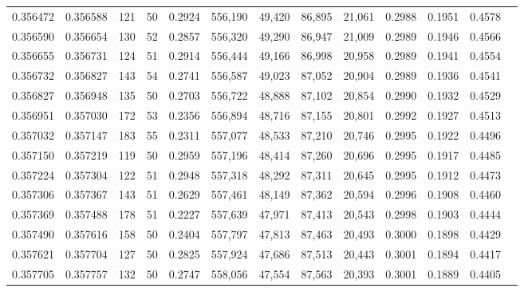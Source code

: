 \begin{tabular}{rrrrrrrrrrrrr}
0.356472 & 0.356588 &   121 &  50 &                                     0.2924 & 556,190 &  49,420 &  86,895 &  21,061 & 0.2988 & 0.1951 & 0.4578 \\
0.356590 & 0.356654 &   130 &  52 &                                     0.2857 & 556,320 &  49,290 &  86,947 &  21,009 & 0.2989 & 0.1946 & 0.4566 \\
0.356655 & 0.356731 &   124 &  51 &                                     0.2914 & 556,444 &  49,166 &  86,998 &  20,958 & 0.2989 & 0.1941 & 0.4554 \\
0.356732 & 0.356827 &   143 &  54 &                                     0.2741 & 556,587 &  49,023 &  87,052 &  20,904 & 0.2989 & 0.1936 & 0.4541 \\
0.356827 & 0.356948 &   135 &  50 &                                     0.2703 & 556,722 &  48,888 &  87,102 &  20,854 & 0.2990 & 0.1932 & 0.4529 \\
0.356951 & 0.357030 &   172 &  53 &                                     0.2356 & 556,894 &  48,716 &  87,155 &  20,801 & 0.2992 & 0.1927 & 0.4513 \\
0.357032 & 0.357147 &   183 &  55 &                                     0.2311 & 557,077 &  48,533 &  87,210 &  20,746 & 0.2995 & 0.1922 & 0.4496 \\
0.357150 & 0.357219 &   119 &  50 &                                     0.2959 & 557,196 &  48,414 &  87,260 &  20,696 & 0.2995 & 0.1917 & 0.4485 \\
0.357224 & 0.357304 &   122 &  51 &                                     0.2948 & 557,318 &  48,292 &  87,311 &  20,645 & 0.2995 & 0.1912 & 0.4473 \\
0.357306 & 0.357367 &   143 &  51 &                                     0.2629 & 557,461 &  48,149 &  87,362 &  20,594 & 0.2996 & 0.1908 & 0.4460 \\
0.357369 & 0.357488 &   178 &  51 &                                     0.2227 & 557,639 &  47,971 &  87,413 &  20,543 & 0.2998 & 0.1903 & 0.4444 \\
0.357490 & 0.357616 &   158 &  50 &                                     0.2404 & 557,797 &  47,813 &  87,463 &  20,493 & 0.3000 & 0.1898 & 0.4429 \\
0.357621 & 0.357704 &   127 &  50 &                                     0.2825 & 557,924 &  47,686 &  87,513 &  20,443 & 0.3001 & 0.1894 & 0.4417 \\
0.357705 & 0.357757 &   132 &  50 &                                     0.2747 & 558,056 &  47,554 &  87,563 &  20,393 & 0.3001 & 0.1889 & 0.4405 \\

\end{tabular}
